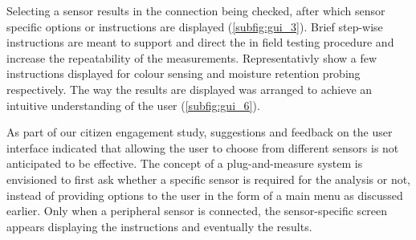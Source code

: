 Selecting a sensor results in the connection being checked, after which sensor specific options or instructions are displayed (\cref{subfig:gui_3}). Brief step-wise instructions are meant to support and direct the in field testing procedure and increase the repeatability of the measurements. Representativly  show a few instructions displayed for colour sensing and moisture retention probing respectively. The way the results are displayed was arranged to achieve an intuitive understanding of the user (\cref{subfig:gui_6}).

As part of our citizen engagement study, suggestions and feedback on the user interface indicated that allowing the user to choose from different sensors is not anticipated to be effective. The concept of a plug-and-measure system is envisioned to first ask whether a specific sensor is required for the analysis or not, instead of providing options to the user in the form of a main menu as discussed earlier. Only when a peripheral sensor is connected, the sensor-specific screen appears displaying the instructions and eventually the results.

